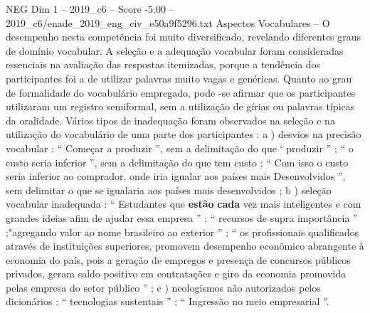 \begin{textsample}{NEG Dim 1 – 2019\_c6 – Score -5.00 – 2019\_c6/enade\_2019\_eng\_civ\_e50a9f5296.txt}
Aspectos Vocabulares – O desempenho nesta competência foi muito diversificado, revelando diferentes graus de domínio vocabular.
A seleção e a adequação vocabular foram consideradas essenciais na avaliação das respostas itemizadas, porque a tendência dos participantes foi a de utilizar palavras muito vagas e genéricas.
Quanto ao grau de formalidade do vocabulário empregado, pode -se afirmar que os participantes utilizaram um registro semiformal, sem a utilização de gírias ou palavras típicas da oralidade.
Vários tipos de inadequação foram observados na seleção e na utilização do vocabulário de uma parte dos participantes : a ) desvios na precisão vocabular : “ Começar a produzir ”, sem a delimitação do que ‘ produzir ” ; “ o custo seria inferior ”, sem a delimitação do que tem custo ; “ Com isso o custo seria inferior ao comprador, onde iria igualar aos países mais Desenvolvidos ”, sem delimitar o que se igualaria aos países mais desenvolvidos ; b ) seleção vocabular inadequada : “ Estudantes que \textbf{estão} \textbf{cada} vez mais inteligentes e com grandes ideias afim de ajudar essa empresa ” ; “ recursos de supra importância ” ;"agregando valor ao nome brasileiro ao exterior ” ; “ os profissionais qualificados através de instituições superiores, promovem desempenho econômico abrangente à economia do país, pois a geração de empregos e presença de concursos públicos privados, geram saldo positivo em contratações e giro da economia promovida pelas empresa do setor público ” ; c ) neologismos não autorizados pelos dicionários : “ tecnologias sustentais ” ; “ Ingressão no meio empresarial ”.

\end{textsample}
